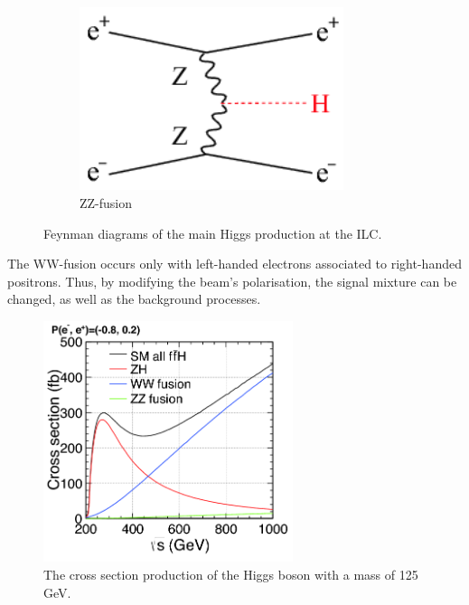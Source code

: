 \begin{figure}
\begin{subfigure}[t]{0.3\textwidth}
            \includegraphics[width = 0.85\textwidth]{Pictures/Higgs/HiggsProd_eeH.png}
            \caption{ZZ-fusion}
            \label{fig:ZZ-fusion}
        \end{subfigure}
        \caption{Feynman diagrams of the main Higgs production at the ILC\cite{Asner2013}\cite{tian}.}
        \label{fig:higgsProduction}
    \end{figure}    
    
    The WW-fusion occurs only with left-handed electrons associated to right-handed positrons.
    Thus, by modifying the beam's polarisation, the signal mixture can be changed, as well as the background processes.

    \begin{figure}[!h]
      \centering
      \includegraphics[width = 0.65\textwidth]{Pictures/Higgs/higgs_xsec_P-8_3.png}
      \caption{The cross section production of the Higgs boson with a mass of 125 GeV\cite{Asner2013}.}
      \label{fig:higgsXsec}
    \end{figure}

